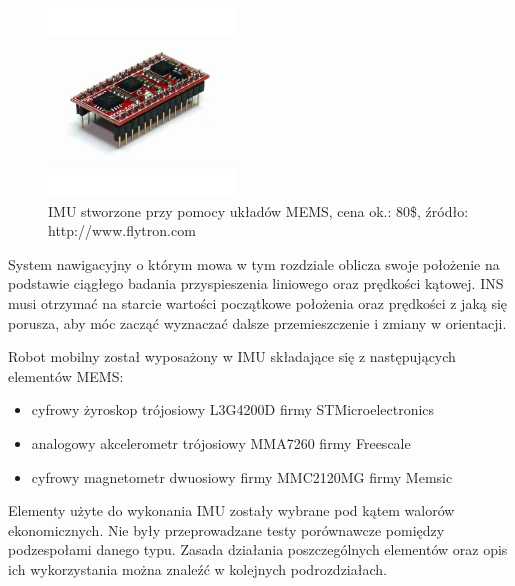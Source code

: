 \begin{figure}[h!]
 \centering
 \includegraphics[height=50mm]{../images/ch04/mems_imu.jpg}
 \caption{IMU stworzone przy pomocy układów MEMS, cena ok.: 80\$, źródło: http://www.flytron.com}
 \label{fig:Zyrokompas}
\end{figure}

System nawigacyjny o którym mowa w tym rozdziale oblicza swoje położenie na
podstawie ciągłego badania przyspieszenia liniowego oraz prędkości kątowej. INS
musi otrzymać na starcie wartości początkowe położenia oraz prędkości z jaką się
porusza, aby móc zacząć wyznaczać dalsze przemieszczenie i zmiany w orientacji.

Robot mobilny został wyposażony w IMU składające się z następujących elementów MEMS:
\begin{itemize}
  \item cyfrowy żyroskop trójosiowy L3G4200D firmy STMicroelectronics
  \item analogowy akcelerometr trójosiowy MMA7260 firmy Freescale
  \item cyfrowy magnetometr dwuosiowy firmy MMC2120MG firmy Memsic
\end{itemize}
Elementy użyte do wykonania IMU zostały wybrane pod kątem walorów ekonomicznych. 
Nie były przeprowadzane testy porównawcze pomiędzy podzespołami danego typu.
Zasada działania poszczególnych elementów oraz opis ich wykorzystania można znaleźć w kolejnych podrozdziałach.
